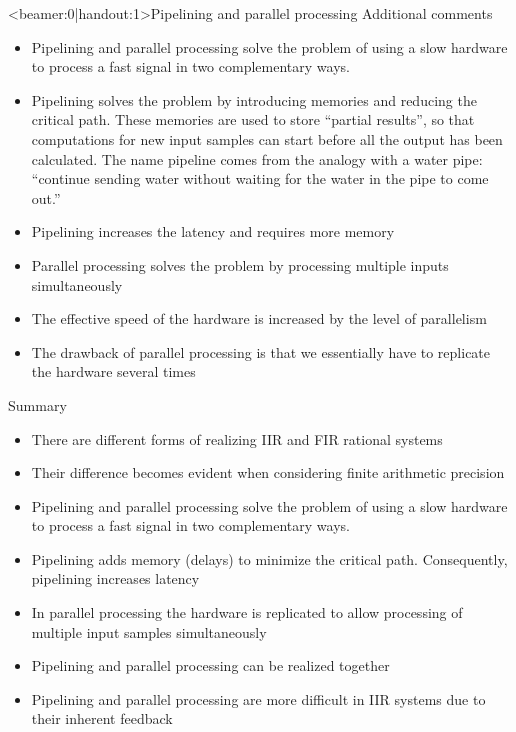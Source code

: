 \documentclass[10pt]{beamer}
\begin{document}
\begin{frame}<beamer:0|handout:1>{Pipelining and parallel processing}
Additional comments

\begin{itemize}
	\item Pipelining and parallel processing solve the problem of using a slow hardware to process a fast signal in two complementary ways. 
	\item Pipelining solves the problem  by introducing memories and reducing the critical path. These memories are used to store ``partial results'', so that computations for new input samples can start before all the output has been calculated. The name pipeline comes from the analogy with a water pipe: ``continue sending water without waiting for the water in the pipe to come out.''
	\item Pipelining increases the latency and requires more memory
	\item Parallel processing solves the problem by processing multiple inputs simultaneously
	\item The effective speed of the hardware is increased by the level of parallelism
	\item The drawback of parallel processing is that we essentially have to replicate the hardware several times
\end{itemize}
\end{frame}


%
\begin{frame}{Summary}
\begin{itemize}
	\item There are different forms of realizing IIR and FIR rational systems
	\item Their difference becomes evident when considering finite arithmetic precision
	\item Pipelining and parallel processing solve the problem of using a slow hardware to process a fast signal in two complementary ways. 
	\item Pipelining adds memory (delays) to minimize the critical path. Consequently, pipelining increases latency
	\item In parallel processing the hardware is replicated to allow processing of multiple input samples simultaneously
	\item Pipelining and parallel processing can be realized together
	\item Pipelining and parallel processing are more difficult in IIR systems due to their inherent feedback
\end{itemize}
\end{frame}
\end{document}
